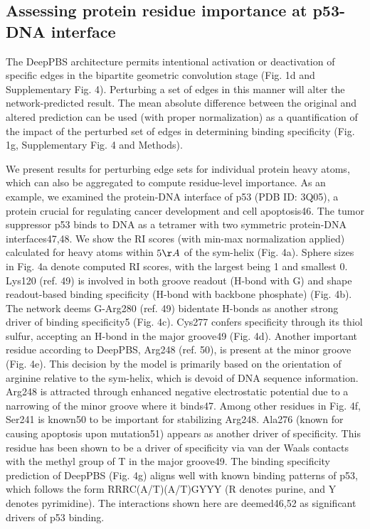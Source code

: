 \subsection{Assessing protein residue importance at p53-DNA interface}
The DeepPBS architecture permits intentional activation or deactivation of specific edges in the bipartite geometric convolution stage (Fig. 1d and Supplementary Fig. 4). Perturbing a set of edges in this manner will alter the network-predicted result. The mean absolute difference between the original and altered prediction can be used (with proper normalization) as a quantification of the impact of the perturbed set of edges in determining binding specificity (Fig. 1g, Supplementary Fig. 4 and Methods).
\par
We present results for perturbing edge sets for individual protein heavy atoms, which can also be aggregated to compute residue-level importance. As an example, we examined the protein-DNA interface of p53 (PDB ID: 3Q05), a protein crucial for regulating cancer development and cell apoptosis46. The tumor suppressor p53 binds to DNA as a tetramer with two symmetric protein-DNA interfaces47,48. We show the RI scores (with min-max normalization applied) calculated for heavy atoms within $5\AA$ of the sym-helix (Fig. 4a). Sphere sizes in Fig. 4a denote computed RI scores, with the largest being 1 and smallest 0. Lys120 (ref. 49) is involved in both groove readout (H-bond with G) and shape readout-based binding specificity (H-bond with backbone phosphate) (Fig. 4b). The network deems G-Arg280 (ref. 49) bidentate H-bonds as another strong driver of binding specificity5 (Fig. 4c). Cys277 confers specificity through its thiol sulfur, accepting an H-bond in the major groove49 (Fig. 4d). Another important residue according to DeepPBS, Arg248 (ref. 50), is present at the minor groove (Fig. 4e). This decision by the model is primarily based on the orientation of arginine relative to the sym-helix, which is devoid of DNA sequence information. Arg248 is attracted through enhanced negative electrostatic potential due to a narrowing of the minor groove where it binds47. Among other residues in Fig. 4f, Ser241 is known50 to be important for stabilizing Arg248. Ala276 (known for causing apoptosis upon mutation51) appears as another driver of specificity. This residue has been shown to be a driver of specificity via van der Waals contacts with the methyl group of T in the major groove49. The binding specificity prediction of DeepPBS (Fig. 4g) aligns well with known binding patterns of p53, which follows the form RRRC(A/T)(A/T)GYYY (R denotes purine, and Y denotes pyrimidine). The interactions shown here are deemed46,52 as significant drivers of p53 binding.

